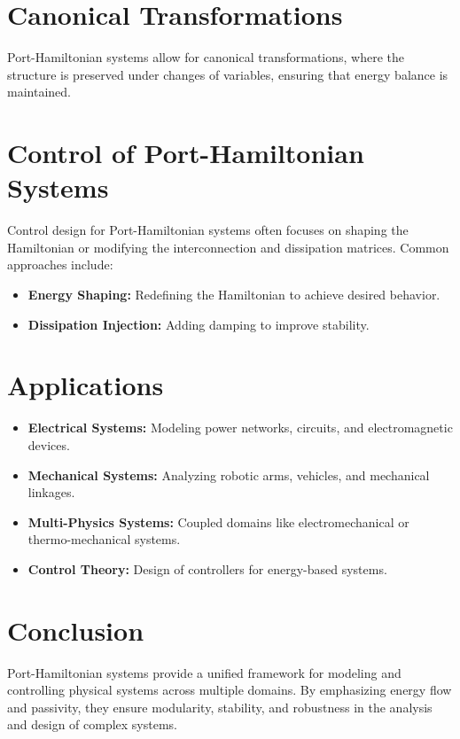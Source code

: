\section{Canonical Transformations}
Port-Hamiltonian systems allow for canonical transformations, where the structure is preserved under changes of variables, ensuring that energy balance is maintained.

\section*{Control of Port-Hamiltonian Systems}
Control design for Port-Hamiltonian systems often focuses on shaping the Hamiltonian or modifying the interconnection and dissipation matrices. Common approaches include:
\begin{itemize}
    \item \textbf{Energy Shaping:} Redefining the Hamiltonian to achieve desired behavior.
    \item \textbf{Dissipation Injection:} Adding damping to improve stability.
\end{itemize}

\section{Applications}
\begin{itemize}
    \item \textbf{Electrical Systems:} Modeling power networks, circuits, and electromagnetic devices.
    \item \textbf{Mechanical Systems:} Analyzing robotic arms, vehicles, and mechanical linkages.
    \item \textbf{Multi-Physics Systems:} Coupled domains like electromechanical or thermo-mechanical systems.
    \item \textbf{Control Theory:} Design of controllers for energy-based systems.
\end{itemize}

\section{Conclusion}
Port-Hamiltonian systems provide a unified framework for modeling and controlling physical systems across multiple domains. By emphasizing energy flow and passivity, they ensure modularity, stability, and robustness in the analysis and design of complex systems.

